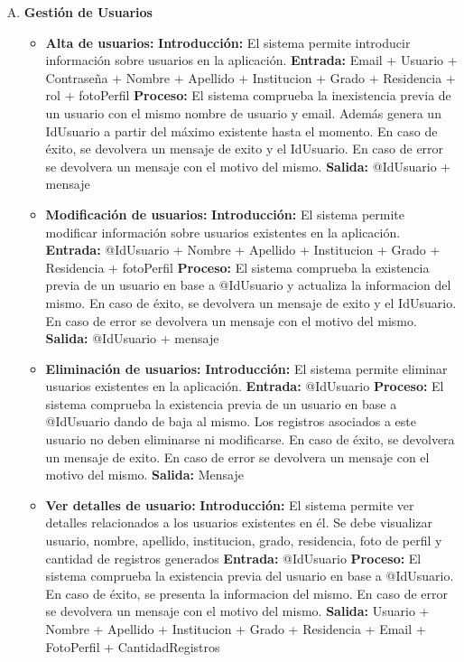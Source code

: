  \begin{enumerate}[A.]
    \item \textbf{Gestión de Usuarios}

        \begin{itemize}  
            \item \textbf{Alta de usuarios:}
                \tab\textbf{Introducción:} El sistema permite introducir información sobre usuarios en la aplicación.
                \tab\textbf{Entrada:} Email + Usuario + Contraseña + Nombre + Apellido + Institucion + Grado + Residencia + rol + fotoPerfil
                \tab\textbf{Proceso:} El sistema comprueba la inexistencia previa de un usuario con el mismo nombre de usuario y email. Además genera un IdUsuario a partir del máximo existente hasta el momento. En caso de éxito, se devolvera un mensaje de exito y el IdUsuario. En caso de error se devolvera un mensaje con el motivo del mismo.
                \tab\textbf{Salida:} @IdUsuario + mensaje
        
            \item \textbf{Modificación de usuarios:}
                \tab\textbf{Introducción:} El sistema permite modificar información sobre usuarios existentes en la aplicación.
                \tab\textbf{Entrada:} @IdUsuario + Nombre + Apellido + Institucion + Grado + Residencia + fotoPerfil
                \tab\textbf{Proceso:} El sistema comprueba la existencia previa de un usuario en base a @IdUsuario y actualiza la informacion del mismo. En caso de éxito, se devolvera un mensaje de exito y el IdUsuario. En caso de error se devolvera un mensaje con el motivo del mismo.
                \tab\textbf{Salida:} @IdUsuario + mensaje
    
            \item \textbf{Eliminación de usuarios:}
                \tab\textbf{Introducción:} El sistema permite eliminar usuarios existentes en la aplicación.
                \tab\textbf{Entrada:} @IdUsuario
                \tab\textbf{Proceso:} El sistema comprueba la existencia previa de un usuario en base a @IdUsuario dando de baja al mismo. Los registros asociados a este usuario no deben eliminarse ni modificarse. En caso de éxito, se devolvera un mensaje de exito. En caso de error se devolvera un mensaje con el motivo del mismo.
                \tab\textbf{Salida:} Mensaje

            \item \textbf{Ver detalles de usuario:}
                \tab\textbf{Introducción:} El sistema permite ver detalles relacionados a los usuarios existentes en él. Se debe visualizar usuario, nombre, apellido, institucion, grado, residencia, foto de perfil y cantidad de registros generados
                \tab\textbf{Entrada:} @IdUsuario
                \tab\textbf{Proceso:} El sistema comprueba la existencia previa del usuario en base a @IdUsuario. En caso de éxito, se presenta la informacion del mismo. En caso de error se devolvera un mensaje con el motivo del mismo.
                \tab\textbf{Salida:} Usuario + Nombre + Apellido + Institucion + Grado + Residencia + Email + FotoPerfil + CantidadRegistros


\end{itemize}
\end{enumerate}
